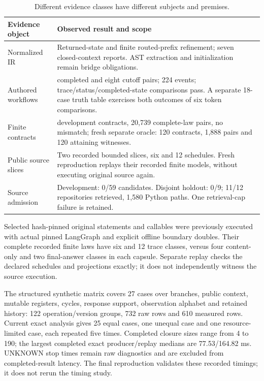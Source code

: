 \documentclass[preprint,12pt,a4paper]{elsarticle}
\begin{document}
\begin{table}[h]
\small\centering
\begin{tabularx}{\textwidth}{@{}>{\raggedright\arraybackslash}p{3.4cm} >{\raggedright\arraybackslash}X@{}}
\toprule
Evidence object & Observed result and scope \\
\midrule
Normalized IR & Returned-state and finite routed-prefix refinement; seven closed-context reports. AST extraction and initialization remain bridge obligations. \\
Authored workflows & 96 completed and eight cutoff pairs; 224 events; trace/status/completed-state comparisons pass. A separate 18-case truth table exercises both outcomes of six token comparisons. \\
Finite contracts & 26 development contracts, 20,739 complete-law pairs, no mismatch; fresh separate oracle: 120 contracts, 1,888 pairs and 120 attaining witnesses. \\
Public source slices & Two recorded bounded slices, six and 12 schedules. Fresh reproduction replays their recorded finite models, without executing original source again. \\
Source admission & Development: 0/59 candidates. Disjoint holdout: 0/9; 11/12 repositories retrieved, 1,580 Python paths. One retrieval-cap failure is retained. \\
\bottomrule
\end{tabularx}
\caption{Different evidence classes have different subjects and premises.}
\end{table}
\FloatBarrier

Selected hash-pinned original statements and callables were previously executed with actual pinned LangGraph and explicit offline boundary doubles. Their complete recorded finite laws have six and 12 trace classes, versus four content-only and two final-answer classes in each capsule. Separate replay checks the declared schedules and projections exactly; it does not independently witness the source execution.

The structured synthetic matrix covers 27 cases over branches, public context, mutable registers, cycles, response support, observation alphabet and retained history: 122 operation/version groups, 732 raw rows and 610 measured rows. Current exact analysis gives 25 equal cases, one unequal case and one resource-limited case, each repeated five times. Completed closure sizes range from 4 to 190; the largest completed exact producer/replay medians are 77.53/164.82 ms. UNKNOWN stop times remain raw diagnostics and are excluded from completed-result latency. The final reproduction validates these recorded timings; it does not rerun the timing study.
\end{document}
